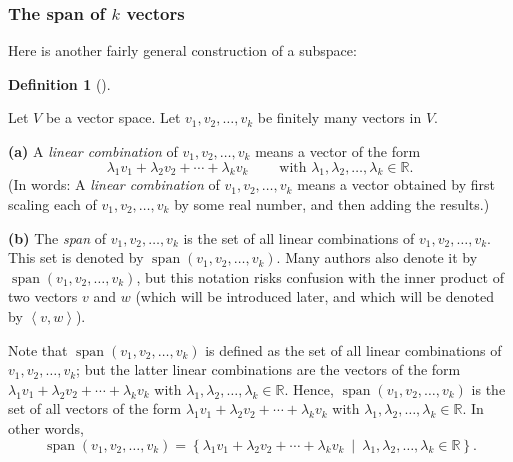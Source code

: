 \documentclass[numbers=enddot,12pt,final,onecolumn,notitlepage]{scrartcl}%
\theoremstyle{definition}
\newtheorem{defi}[theo]{Definition}
\newenvironment{definition}[1][]
{\begin{defi}[#1]\begin{leftbar}}
{\end{leftbar}\end{defi}}
\begin{document}
\subsubsection{The span of $k$ vectors}

Here is another fairly general construction of a subspace:

\begin{definition}
\label{def.subspace.span}Let $V$ be a vector space. Let $v_{1},v_{2}%
,\ldots,v_{k}$ be finitely many vectors in $V$.

\textbf{(a)} A \textit{linear combination} of $v_{1},v_{2},\ldots,v_{k}$ means
a vector of the form%
\[
\lambda_{1}v_{1}+\lambda_{2}v_{2}+\cdots+\lambda_{k}v_{k}%
\ \ \ \ \ \ \ \ \ \ \text{with }\lambda_{1},\lambda_{2},\ldots,\lambda_{k}%
\in\mathbb{R}.
\]
(In words: A \textit{linear combination} of $v_{1},v_{2},\ldots,v_{k}$ means a
vector obtained by first scaling each of $v_{1},v_{2},\ldots,v_{k}$ by some
real number, and then adding the results.)

\textbf{(b)} The \textit{span} of $v_{1},v_{2},\ldots,v_{k}$ is the set of all
linear combinations of $v_{1},v_{2},\ldots,v_{k}$. This set is denoted by
$\operatorname*{span}\left(  v_{1},v_{2},\ldots,v_{k}\right)  $. Many authors
also denote it by $\operatorname{span}\left(  v_{1},v_{2},\ldots,v_{k}\right)
$, but this notation risks confusion with the inner product of two vectors $v$
and $w$ (which will be introduced later, and which will be denoted by $\left<
v,w\right> $).

Note that $\operatorname{span}\left(  v_{1},v_{2},\ldots,v_{k}\right)  $ is
defined as the set of all linear combinations of $v_{1},v_{2},\ldots,v_{k}$;
but the latter linear combinations are the vectors of the form $\lambda
_{1}v_{1}+\lambda_{2}v_{2}+\cdots+\lambda_{k}v_{k}$ with $\lambda_{1}%
,\lambda_{2},\ldots,\lambda_{k}\in\mathbb{R}$. Hence, $\operatorname{span}%
\left(  v_{1},v_{2},\ldots,v_{k}\right)  $ is the set of all vectors of the
form $\lambda_{1}v_{1}+\lambda_{2}v_{2}+\cdots+\lambda_{k}v_{k}$ with
$\lambda_{1},\lambda_{2},\ldots,\lambda_{k}\in\mathbb{R}$. In other words,%
\begin{equation}
\operatorname{span}\left(  v_{1},v_{2},\ldots,v_{k}\right)  =\left\{
\lambda_{1}v_{1}+\lambda_{2}v_{2}+\cdots+\lambda_{k}v_{k}\ \mid\ \lambda
_{1},\lambda_{2},\ldots,\lambda_{k}\in\mathbb{R}\right\}  .
\label{eq.def.subspace.span.explicit}%
\end{equation}

\end{definition}
\end{document}
